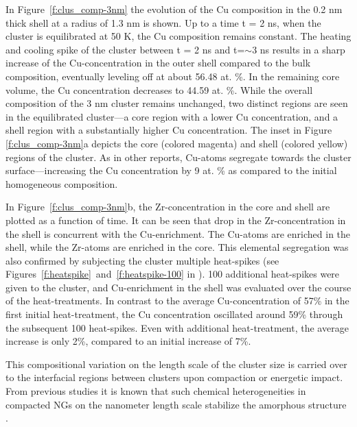 \begin{changebar}
In Figure~\ref{f:clus_comp-3nm} the evolution of the Cu composition in the 0.2 nm thick shell at a radius of 1.3 nm is shown. Up to a time t = 2 ns, when the cluster is equilibrated at 50 K, the Cu composition remains constant. The heating and cooling spike of the cluster between t = 2 ns and t=$\sim$3 ns results in a sharp increase of the Cu-concentration in the outer shell compared to the bulk composition, eventually leveling off at about 56.48 at. \%. In the remaining core volume, the Cu concentration decreases to 44.59 at. \%. While the overall composition of the 3 nm cluster remains unchanged, two distinct regions are seen in the equilibrated cluster---a core region with a lower Cu concentration, and a shell region with a substantially higher Cu concentration. The inset in Figure \ref{f:clus_comp-3nm}a depicts the core (colored magenta) and shell (colored yellow) regions of the cluster. As in other reports, Cu-atoms segregate towards the cluster surface---increasing the Cu concentration by 9 at. \% as compared to the initial homogeneous composition. \end{changebar} In Figure~\ref{f:clus_comp-3nm}b, the Zr-concentration in the core and shell are plotted as a function of time. It can be seen that drop in the Zr-concentration in the shell is concurrent with the Cu-enrichment. The Cu-atoms are enriched in the shell, while the Zr-atoms are enriched in the core. This elemental segregation was also confirmed by subjecting the cluster multiple heat-spikes (see Figures~\ref{f:heatspike}~and~\ref{f:heatspike-100} in ). 100 additional heat-spikes were given to the \cz cluster, and Cu-enrichment in the shell was evaluated over the course of the heat-treatments. In contrast to the average Cu-concentration of 57\% in the first initial heat-treatment, the Cu concentration oscillated around 59\% through the subsequent 100 heat-spikes. Even with additional heat-treatment, the average increase is only 2\%, compared to an initial increase of 7\%. \begin{changebar} This compositional variation on the length scale of the cluster size is carried over to the interfacial regions between clusters upon compaction or energetic impact. From previous studies it is known that such chemical heterogeneities in compacted NGs on the nanometer length scale stabilize the amorphous structure \cite{Adjaoud2016}. \par
\end{changebar}

